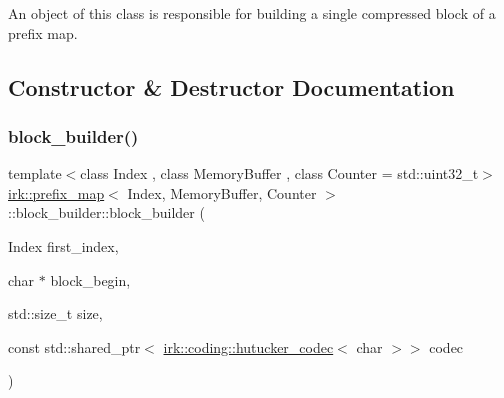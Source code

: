 An object of this class is responsible for building a single compressed block of a prefix map. 

\subsection{Constructor \& Destructor Documentation}
\mbox{\label{classirk_1_1prefix__map_1_1block__builder_ad2fe3431c27790ef67d21746064cdb6c}} 
\subsubsection{\texorpdfstring{block\+\_\+builder()}{block\_builder()}\hspace{0.1cm}{\footnotesize\ttfamily [1/2]}}
{\footnotesize\ttfamily template$<$class Index , class Memory\+Buffer , class Counter  = std\+::uint32\+\_\+t$>$ \\
\mbox{\hyperlink{classirk_1_1prefix__map}{irk\+::prefix\+\_\+map}}$<$ Index, Memory\+Buffer, Counter $>$\+::block\+\_\+builder\+::block\+\_\+builder (\begin{DoxyParamCaption}\item[{Index}]{first\+\_\+index,  }\item[{char $\ast$}]{block\+\_\+begin,  }\item[{std\+::size\+\_\+t}]{size,  }\item[{const std\+::shared\+\_\+ptr$<$ \mbox{\hyperlink{classirk_1_1coding_1_1hutucker__codec}{irk\+::coding\+::hutucker\+\_\+codec}}$<$ char $>$$>$}]{codec }\end{DoxyParamCaption})\hspace{0.3cm}{\ttfamily [inline]}}

\mbox{\label{classirk_1_1prefix__map_1_1block__builder_a9c1475781fa1f5e3ed41aee76ab6adc0}} 
